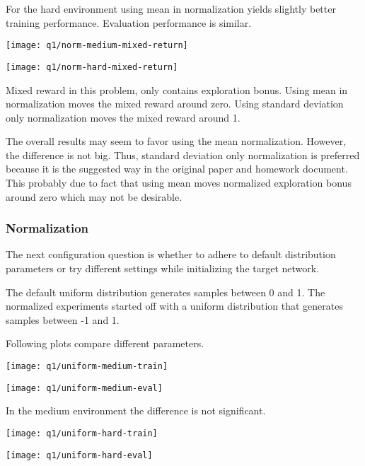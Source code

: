\documentclass[11pt]{article}
\begin{document}
    For the hard environment using mean in normalization yields slightly better training performance.
    Evaluation performance is similar.

    \hspace*{-0.6in}
    \texttt{[image: q1/norm-medium-mixed-return]}

    \hspace*{-0.6in}
    \texttt{[image: q1/norm-hard-mixed-return]}

    Mixed reward in this problem, only contains exploration bonus.
    Using mean in normalization moves the mixed reward around zero.
    Using standard deviation only normalization moves the mixed reward around 1.

    The overall results may seem to favor using the mean normalization.
    However, the difference is not big.
    Thus, standard deviation only normalization is preferred because it is the suggested way in the original paper and homework document.
    This probably due to fact that using mean moves normalized exploration bonus around zero which may not be desirable.

    \subsubsection{Normalization}

    The next configuration question is whether to adhere to default distribution parameters or try different settings while initializing the target network.

    The default uniform distribution generates samples between 0 and 1.
    The normalized experiments started off with a uniform distribution that generates samples between -1 and 1.

    Following plots compare different parameters.

    \hspace*{-0.6in}
    \texttt{[image: q1/uniform-medium-train]}

    \hspace*{-0.6in}
    \texttt{[image: q1/uniform-medium-eval]}

    In the medium environment the difference is not significant.

    \hspace*{-0.6in}
    \texttt{[image: q1/uniform-hard-train]}

    \hspace*{-0.6in}
    \texttt{[image: q1/uniform-hard-eval]}
\end{document}
